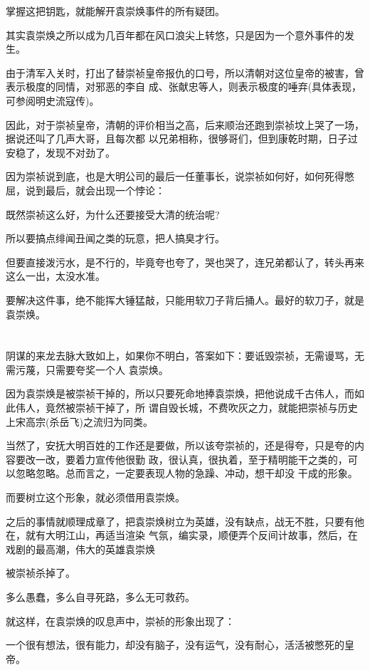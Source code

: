 \documentclass[11pt,a4paper,onecolumn]{article}
\begin{document}
掌握这把钥匙，就能解开袁崇焕事件的所有疑团。

其实袁崇焕之所以成为几百年都在风口浪尖上转悠，只是因为一个意外事件的发生。

由于清军入关时，打出了替崇祯皇帝报仇的口号，所以清朝对这位皇帝的被害，曾表示极度的同情，对邪恶的李自
成、张献忠等人，则表示极度的唾弃(具体表现，可参阅明史流寇传)。

因此，对于崇祯皇帝，清朝的评价相当之高，后来顺治还跑到崇祯坟上哭了一场，据说还叫了几声大哥，且每次都
以兄弟相称，很够哥们，但到康乾时期，日子过安稳了，发现不对劲了。

因为崇祯说到底，也是大明公司的最后一任董事长，说崇祯如何好，如何死得憋屈，说到最后，就会出现一个悖论：

既然崇祯这么好，为什么还要接受大清的统治呢?

所以要搞点绯闻丑闻之类的玩意，把人搞臭才行。

但要直接泼污水，是不行的，毕竟夸也夸了，哭也哭了，连兄弟都认了，转头再来这么一出，太没水准。

要解决这件事，绝不能挥大锤猛敲，只能用软刀子背后捅人。最好的软刀子，就是袁崇焕。

\section[\thesection]{}

阴谋的来龙去脉大致如上，如果你不明白，答案如下：要诋毁崇祯，无需谩骂，无需污蔑，只需要夸奖一个人\myrule 
袁崇焕。

因为袁崇焕是被崇祯干掉的，所以只要死命地捧袁崇焕，把他说成千古伟人，而如此伟人，竟然被崇祯干掉了，所
谓自毁长城，不费吹灰之力，就能把崇祯与历史上宋高宗(杀岳飞)之流归为同类。

当然了，安抚大明百姓的工作还是要做，所以该夸崇祯的，还是得夸，只是夸的内容要改一改，要着力宣传他很勤
政，很认真，很执着，至于精明能干之类的，可以忽略忽略。总而言之，一定要表现人物的急躁、冲动，想干却没
干成的形象。

而要树立这个形象，就必须借用袁崇焕。

之后的事情就顺理成章了，把袁崇焕树立为英雄，没有缺点，战无不胜，只要有他在，就有大明江山，再适当渲染
气氛，编实录，顺便弄个反间计故事，然后，在戏剧的最高潮，伟大的英雄袁崇焕\myrule 

被崇祯杀掉了。

多么愚蠢，多么自寻死路，多么无可救药。

就这样，在袁崇焕的叹息声中，崇祯的形象出现了：

一个很有想法，很有能力，却没有脑子，没有运气，没有耐心，活活被憋死的皇帝。
\end{document}
